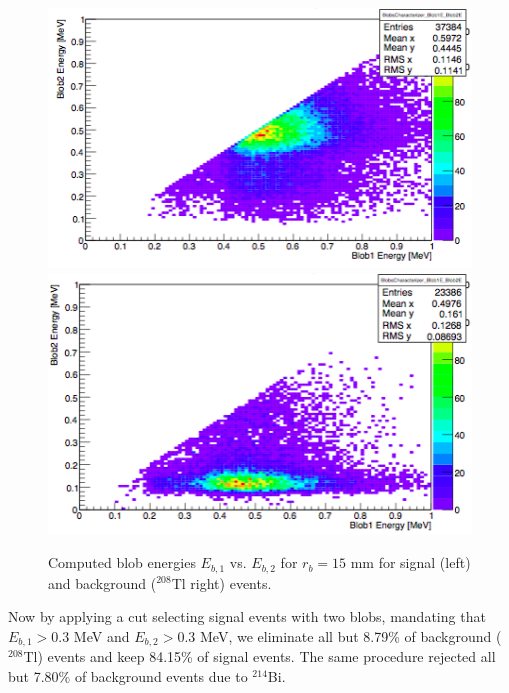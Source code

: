 \documentclass[a4paper,11pt]{article}
\begin{document}
\begin{figure}[!htb]
	\centering
	\includegraphics[scale = 0.45]{fig/blobcuts_bb0nu_2x2x2_E1vsE2.png}
	\includegraphics[scale = 0.45]{fig/blobcuts_Tl208_2x2x2_E1vsE2.png}
	\caption{Computed blob energies $E_{b,1}$ vs. $E_{b,2}$ for $r_b = 15$ mm for signal (left) and background ($^{208}$Tl right) events.} \label{fig.blobcuts}
\end{figure}

Now by applying a cut selecting signal events with two blobs, mandating that $E_{b,1} > 0.3$ MeV and $E_{b,2} > 0.3$ MeV, we eliminate all but 8.79\% of background ($^{208}$Tl) events 
and keep 84.15\% of signal events.  The same procedure rejected all but 7.80\% of background events due to $^{214}$Bi.


\end{document}
